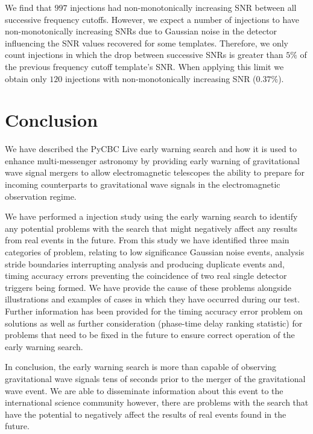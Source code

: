 We find that $997$ injections had non-monotonically increasing SNR between all successive frequency cutoffs. However, we expect a number of injections to have non-monotonically increasing SNRs due to Gaussian noise in the detector influencing the SNR values recovered for some templates. Therefore, we only count injections in which the drop between successive SNRs is greater than $5\%$ of the previous frequency cutoff template's SNR. When applying this limit we obtain only $120$ injections with non-monotonically increasing SNR ($0.37\%$).




\section{\label{6:sec:conclusion}Conclusion}

We have described the PyCBC Live early warning search and how it is used to enhance multi-messenger astronomy by providing early warning of gravitational wave signal mergers to allow electromagnetic telescopes the ability to prepare for incoming counterparts to gravitational wave signals in the electromagnetic observation regime.

We have performed a injection study using the early warning search to identify any potential problems with the search that might negatively affect any results from real events in the future. From this study we have identified three main categories of problem, relating to low significance Gaussian noise events, analysis stride boundaries interrupting analysis and producing duplicate events and, timing accuracy errors preventing the coincidence of two real single detector triggers being formed. We have provide the cause of these problems alongside illustrations and examples of cases in which they have occurred during our test. Further information has been provided for the timing accuracy error problem on solutions as well as further consideration (phase-time delay ranking statistic) for problems that need to be fixed in the future to ensure correct operation of the early warning search.

In conclusion, the early warning search is more than capable of observing gravitational wave signals tens of seconds prior to the merger of the gravitational wave event. We are able to disseminate information about this event to the international science community however, there are problems with the search that have the potential to negatively affect the results of real events found in the future.















